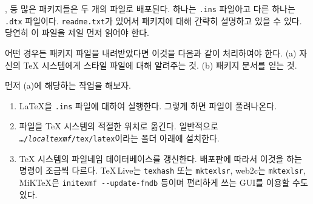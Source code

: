 ,  등 많은 패키지들은 두 개의 파일로 배포된다.
하나는 \texttt{.ins} 파일아고 다른 하나는 \texttt{.dtx} 파일이다.
\texttt{readme.txt}가 있어서 패키지에 대해 간략히 설명하고 있을 수 있다.
당연히 이 파일을 제일 먼저 읽어야 한다.

어떤 경우든 패키지 파일을 내려받았다면 이것을 다음과 같이 처리하여야 한다.
(a) 자신의 \TeX{} 시스템에게 스타일 파일에 대해 알려주는 것.
(b) 패키지 문서를 얻는 것.

먼저 (a)에 해당하는 작업을 해보자.

\begin{enumerate}  
\item \LaTeX 을 \texttt{.ins} 파일에 대하여 실행한다. 그렇게 하면  파일이 풀려나온다.
\item {} 파일을 \TeX{} 시스템의 적절한 위치로 옮긴다. 일반적으로 \\
 \texttt{\ldots/\emph{localtexmf}/tex/latex}이라는 폴더 아래에 설치한다.
\item \TeX{} 시스템의 파일네임 데이터베이스를 갱신한다. 배포판에 따라서 이것을 하는 명령이 조금씩 다르다. \TeX{}\,Live는 \texttt{texhash} 또는 \texttt{mktexlsr}, web2c는 \texttt{mktexlsr}, MiK\TeX 은 \texttt{initexmf -{}-update-fndb} 등이며 편리하게 쓰는 GUI를 이용할 수도 있다.
\end{enumerate}


